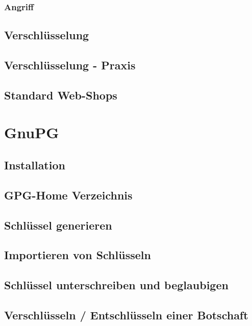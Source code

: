 \subsubsection*{Angriff}

\subsection{Verschlüsselung}

\subsection{Verschlüsselung - Praxis}

\subsection{Standard Web-Shops}

\section{GnuPG}

\subsection{Installation}

\subsection{GPG-Home Verzeichnis}

\subsection{Schlüssel generieren}

\subsection{Importieren von Schlüsseln}

\subsection{Schlüssel unterschreiben und beglaubigen}

\subsection{Verschlüsseln / Entschlüsseln einer Botschaft}


